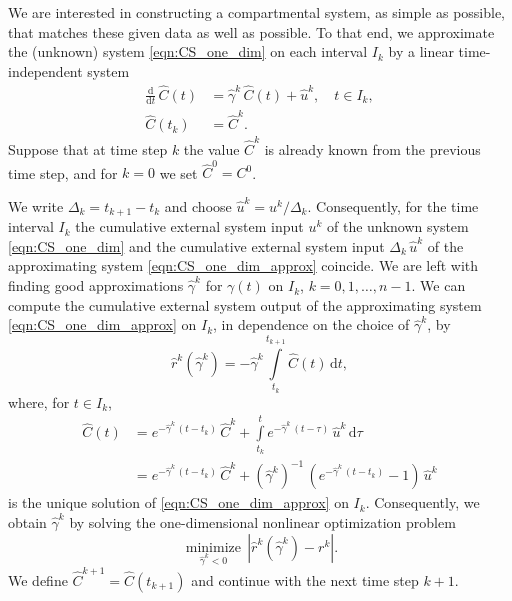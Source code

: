 \documentclass[11pt,a4paper]{article}
\newcommand{\deriv}[1]{\frac{\mathrm{d}}{\mathrm{d}#1}}
\newcommand{\dd}[1]{\,\mathrm{d}#1}
\newcommand{\intl}{\int\limits}
\begin{document}
        We are interested in constructing a compartmental system, as simple as possible, that matches these given data as well as possible.
        To that end, we approximate the (unknown) system \eqref{eqn:CS_one_dim} on each interval $I_k$ by a linear time-independent system
        \begin{equation}\label{eqn:CS_one_dim_approx}
            \begin{aligned}
                \deriv{t}\,\widehat{C}(t) &= \widehat{\gamma}^k\,\widehat{C}(t) + \widehat{u}^k,\quad t\in I_k,\\
                \widehat{C}(t_k) &= \widehat{C}^k.
            \end{aligned}
        \end{equation}
        Suppose that at time step $k$ the value $\widehat{C}^k$ is already known from the previous time step,
        and for $k=0$ we set $\widehat{C}^0=C^0$.
        
        We write $\Delta_k=t_{k+1}-t_k$ and choose $\widehat{u}^k=u^k/\Delta_k$.
        Consequently, for the time interval $I_k$ the cumulative external system input $u^k$ of the unknown system \eqref{eqn:CS_one_dim} and the cumulative external system input $\Delta_k\,\widehat{u}^k$ of the approximating system \eqref{eqn:CS_one_dim_approx} coincide.
        We are left with finding good approximations $\widehat{\gamma}^k$ for $\gamma(t)$ on $I_k$, $k=0,1,\ldots,n-1$.
        We can compute the cumulative external system output of the approximating system \eqref{eqn:CS_one_dim_approx} on $I_k$, in dependence on the choice of $\widehat{\gamma}^k$, by
        \begin{equation*}
            \widehat{r}^k(\widehat{\gamma}^k) = -\widehat{\gamma}^k\intl_{t_k}^{t_{k+1}} \widehat{C}(t)\dd{t},
        \end{equation*}
        where, for $t\in I_k$,
        \begin{align*}
            \widehat{C}(t) &= e^{-\widehat{\gamma}^k\,(t-t_k)}\,\widehat{C}^k + \intl_{t_k}^t e^{-\widehat{\gamma}^k\,(t-\tau)}\,\widehat{u}^k\dd{\tau}\\
            &= e^{-\widehat{\gamma}^k\,(t-t_k)}\,\widehat{C}^k + (\widehat{\gamma}^k)^{-1}\,(e^{-\widehat{\gamma}^k\,(t-t_k)}-1)\,\widehat{u}^k
        \end{align*}
        is the unique solution of \eqref{eqn:CS_one_dim_approx} on $I_k$.
        Consequently, we obtain $\widehat{\gamma}^k$ by solving the one-dimensional nonlinear optimization problem
        \begin{equation*}
            \underset{\widehat{\gamma}^k<0}{\operatorname{minimize}}\,|\widehat{r}^k(\widehat{\gamma}^k)-r^k|.
        \end{equation*}
        We define $\widehat{C}^{k+1}=\widehat{C}(t_{k+1})$ and continue with the next time step $k+1$.
        
\end{document}
